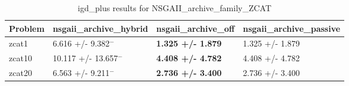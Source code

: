 \begin{table}
\caption{igd_plus results for NSGAII_archive_family_ZCAT}
\label{NSGAII_archive_family_ZCAT_igd_plus}
\begin{tabular}{llll}
\toprule
Problem & nsgaii_archive_hybrid & nsgaii_archive_off & nsgaii_archive_passive \\
\midrule
zcat1 & 6.616 +/- 9.382$^{-}$ & \textbf{1.325 +/- 1.879} & 1.325 +/- 1.879 \\
zcat10 & 10.117 +/- 13.657$^{-}$ & \textbf{4.408 +/- 4.782} & 4.408 +/- 4.782 \\
zcat20 & 6.563 +/- 9.211$^{-}$ & \textbf{2.736 +/- 3.400} & 2.736 +/- 3.400 \\
\bottomrule
\end{tabular}
\end{table}
